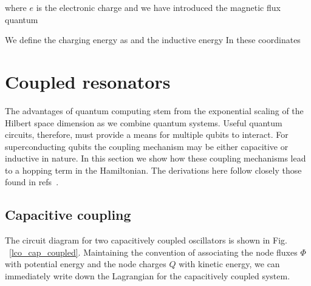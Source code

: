 
where $e$ is the electronic charge and we have introduced the magnetic flux quantum

\noindent
We define the charging energy as
and the inductive energy
In these coordinates


\section{Coupled resonators}
The advantages of quantum computing stem from the exponential scaling of the Hilbert space dimension as we combine quantum systems.
Useful quantum circuits, therefore, must provide a means for multiple qubits to interact.
For superconducting qubits the coupling mechanism may be either capacitive or inductive in nature.
In this section we show how these coupling mechanisms lead to a hopping term in the Hamiltonian.
The derivations here follow closely those found in refs~\cite{DanThesis, JimmyThesis, CharlesThesis, vanDuzer1999, Koch2007, OliverQuantumEngineeringGuide, RoushanSummerSchool}.

\subsection{Capacitive coupling}

The circuit diagram for two capacitively coupled oscillators is shown in Fig.\,~\ref{lco_cap_coupled}.
Maintaining the convention of associating the node fluxes $\Phi$ with potential energy and the node charges $Q$ with kinetic energy,
we can immediately write down the Lagrangian for the capacitively coupled system.

